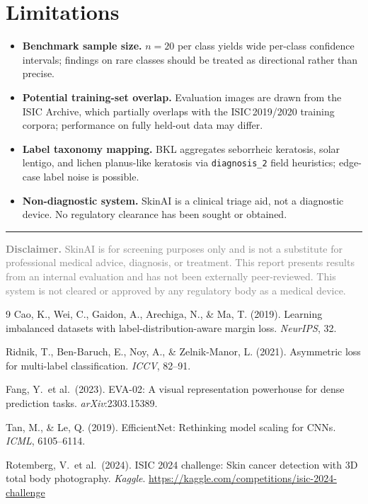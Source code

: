 \documentclass[11pt, letterpaper]{article}
\newcommand{\code}[1]{\texttt{#1}}
\begin{document}
\section{Limitations}

\begin{itemize}[leftmargin=1.4em, itemsep=2pt]
  \item \textbf{Benchmark sample size.} $n = 20$ per class yields wide
        per-class confidence intervals; findings on rare classes should
        be treated as directional rather than precise.
  \item \textbf{Potential training-set overlap.} Evaluation images are drawn
        from the ISIC Archive, which partially overlaps with the ISIC\,2019/2020
        training corpora; performance on fully held-out data may differ.
  \item \textbf{Label taxonomy mapping.} BKL aggregates seborrheic keratosis,
        solar lentigo, and lichen planus-like keratosis via \code{diagnosis\_2}
        field heuristics; edge-case label noise is possible.
  \item \textbf{Non-diagnostic system.} SkinAI is a clinical triage aid, not
        a diagnostic device. No regulatory clearance has been sought or obtained.
\end{itemize}

\vspace{12pt}
\noindent\textcolor{accent}{\rule{\linewidth}{0.6pt}}
\vspace{4pt}
\noindent\small\textcolor{gray}{\textbf{Disclaimer.}
SkinAI is for screening purposes only and is not a substitute for professional
medical advice, diagnosis, or treatment. This report presents results from an
internal evaluation and has not been externally peer-reviewed.
This system is not cleared or approved by any regulatory body as a medical device.}

\vspace{10pt}
\begin{thebibliography}{9}\small
{}
  Cao, K., Wei, C., Gaidon, A., Arechiga, N., \& Ma, T. (2019).
  Learning imbalanced datasets with label-distribution-aware margin loss.
  \textit{NeurIPS}, 32.

  Ridnik, T., Ben-Baruch, E., Noy, A., \& Zelnik-Manor, L. (2021).
  Asymmetric loss for multi-label classification.
  \textit{ICCV}, 82--91.

  Fang, Y.\ et al.\ (2023).
  EVA-02: A visual representation powerhouse for dense prediction tasks.
  \textit{arXiv}:2303.15389.

  Tan, M., \& Le, Q. (2019).
  EfficientNet: Rethinking model scaling for CNNs.
  \textit{ICML}, 6105--6114.

  Rotemberg, V.\ et al.\ (2024).
  ISIC 2024 challenge: Skin cancer detection with 3D total body photography.
  \textit{Kaggle}. \url{https://kaggle.com/competitions/isic-2024-challenge}
\end{thebibliography}
\end{document}

